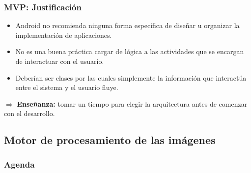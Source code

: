 \begin{frame}[t,fragile]
\frametitle {MVP: Justificación}

\begin{itemize}
	\item Android no recomienda ninguna forma específica de diseñar u organizar la implementación de aplicaciones.
	\vspace{7mm}
	\item No es una buena práctica cargar de lógica a las actividades que se encargan de interactuar	con el usuario.
	\vspace{7mm}
	\item Deberían ser clases por las cuales simplemente la información que interactúa entre el sistema y el usuario fluye.
\end{itemize}
\vspace{3mm}
\begin{center}
	$\Rightarrow$ \textbf{Enseñanza: } tomar un tiempo para elegir la arquitectura antes de comenzar con el desarrollo.

\end{center}

\end{frame}	
\subsection{Motor de procesamiento de las imágenes}

\watermarkon
\begin{frame}
\frametitle{Agenda}

\end{frame}
\watermarkoff



